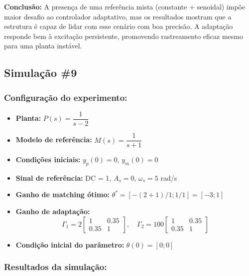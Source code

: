 \documentclass[10pt]{article}
\begin{document}
\textbf{Conclusão:} A presença de uma referência mista (constante + senoidal) impõe maior desafio ao controlador adaptativo, mas os resultados mostram que a estrutura é capaz de lidar com esse cenário com boa precisão. A adaptação responde bem à excitação persistente, promovendo rastreamento eficaz mesmo para uma planta instável.

\newpage

\subsection{Simulação \#9}
\subsubsection{Configuração do experimento:}
\begin{itemize}
\item \textbf{Planta:} $P(s) = \dfrac{1}{s - 2}$
\item \textbf{Modelo de referência:} $M(s) = \dfrac{1}{s + 1}$
\item \textbf{Condições iniciais:} $y_p(0)=0$, $y_m(0)=0$
\item \textbf{Sinal de referência:} DC = 1, $A_s=0$, $\omega_s=5$ rad/s
\item \textbf{Ganho de matching ótimo:} $\theta^* = [-(2+1)/1;1/1] = [-3;1]$
\item \textbf{Ganho de adaptação:} 
\[
\Gamma_1 = 2 \begin{bmatrix} 1 & 0.35 \\ 0.35 & 1 \end{bmatrix}, \quad
\Gamma_2 = 100 \begin{bmatrix} 1 & 0.35 \\ 0.35 & 1 \end{bmatrix}
\]
\item \textbf{Condição inicial do parâmetro:} $\theta(0) = [0;0]$
\end{itemize}

\subsubsection{Resultados da simulação:}
\end{document}
